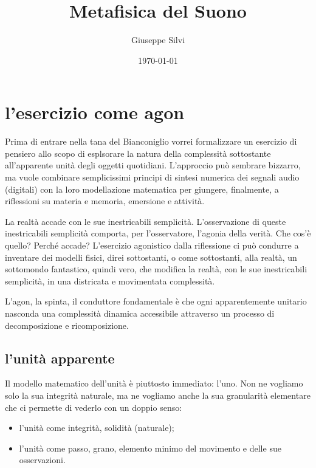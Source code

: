 \documentclass[a4paper,11pt]{article}
\title{Metafisica del Suono}
\author{Giuseppe Silvi}
\date{\today}
\begin{document}
\maketitle

\section{l'esercizio come agon}\hypertarget{lesercizio-come-agon}{}\label{lesercizio-come-agon}

Prima di entrare nella tana del Bianconiglio vorrei formalizzare un
esercizio di pensiero allo scopo di esplsorare la natura della
complessità sottostante all'apparente unità degli oggetti quotidiani.
L'approccio può sembrare bizzarro, ma vuole combinare semplicissimi
principi di sintesi numerica dei segnali audio (digitali) con la loro
modellazione matematica per giungere, finalmente, a riflessioni su
materia e memoria, emersione e attività.

La realtà accade con le sue inestricabili semplicità. L'osservazione di
queste inestricabili semplicità comporta, per l'osservatore, l'agonia
della verità. Che cos'è quello? Perché accade? L'esercizio agonistico
dalla riflessione ci può condurre a inventare dei modelli fisici, direi
sottostanti, o come sottostanti, alla realtà, un sottomondo fantastico,
quindi vero, che modifica la realtà, con le sue inestricabili semplicità,
in una districata e movimentata complessità.

L'agon, la spinta, il conduttore fondamentale è che ogni apparentemente
unitario nasconda una complessità dinamica accessibile attraverso un
processo di decomposizione e ricomposizione.

\subsection{l'unità apparente}\hypertarget{lunit-apparente}{}\label{lunit-apparente}

Il modello matematico dell'unità è piuttosto immediato: l'uno. Non ne
vogliamo solo la sua integrità naturale, ma ne vogliamo anche la sua
granularità elementare che ci permette di vederlo con un doppio senso:

\begin{itemize}
\item{} l'unità come integrità, solidità (naturale);
\item{} l'unità come passo, grano, elemento minimo del movimento e delle sue
 osservazioni.
\end{itemize}
\end{document}
